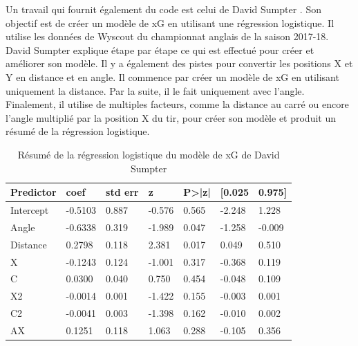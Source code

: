 \documentclass[12pt]{article}
\begin{document}
Un travail qui fournit également du code est celui de David Sumpter \cite{sumpterFittingXGModel}. 
Son objectif est de créer un modèle de xG en utilisant une régression logistique. 
Il utilise les données de Wyscout du championnat anglais de la saison 2017-18. 
David Sumpter explique étape par étape ce qui est effectué pour créer et améliorer son modèle.
Il y a également des pistes pour convertir les positions X et Y en distance et en angle.
Il commence par créer un modèle de xG en utilisant uniquement la distance. 
Par la suite, il le fait uniquement avec l'angle.
Finalement, il utilise de multiples facteurs, comme la distance au carré ou encore l'angle multiplié par la position X du tir, pour créer son modèle et produit un résumé de la régression logistique.

\begin{table}[htp]
    \centering
    \begin{tabular}{|l|l|l|l|l|l|l|}
    \hline
    \textbf{Predictor} & \textbf{coef} & \textbf{std err} & \textbf{z} & \textbf{P\textgreater{}|z|} & \textbf{{[}0.025} & \textbf{0.975{]}} \\ \hline
    Intercept          & -0.5103       & 0.887            & -0.576     & 0.565                       & -2.248            & 1.228             \\ \hline
    Angle              & -0.6338       & 0.319            & -1.989     & 0.047                       & -1.258            & -0.009            \\ \hline
    Distance           & 0.2798        & 0.118            & 2.381      & 0.017                       & 0.049             & 0.510             \\ \hline
    X                  & -0.1243       & 0.124            & -1.001     & 0.317                       & -0.368            & 0.119             \\ \hline
    C                  & 0.0300        & 0.040            & 0.750      & 0.454                       & -0.048            & 0.109             \\ \hline
    X2                 & -0.0014       & 0.001            & -1.422     & 0.155                       & -0.003            & 0.001             \\ \hline
    C2                 & -0.0041       & 0.003            & -1.398     & 0.162                       & -0.010            & 0.002             \\ \hline
    AX                 & 0.1251        & 0.118            & 1.063      & 0.288                       & -0.105            & 0.356             \\ \hline
    \end{tabular}
    \caption{Résumé de la régression logistique du modèle de xG de David Sumpter}
\end{table}
\end{document}
